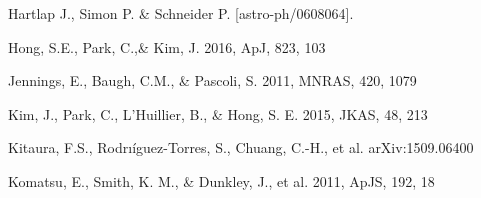 \documentclass[iop]{emulateapj}
\begin{document}
\begin{thebibliography}{}






Hartlap J., Simon P. \& Schneider P. [astro-ph/0608064].


Hong, S.E., Park, C.,\&  Kim, J. 2016, ApJ, 823, 103


Jennings, E., Baugh, C.M., \& Pascoli, S. 2011, MNRAS, 420, 1079  







Kim, J., Park, C., L'Huillier, B., \& Hong, S. E. 2015, JKAS, 48, 213


Kitaura, F.S., Rodrı\'{i}guez-Torres, S., Chuang, C.-H., et al. arXiv:1509.06400

Komatsu, E., Smith, K. M., \& Dunkley, J., et al. 2011, ApJS, 192, 18  


\end{thebibliography}
\end{document}
